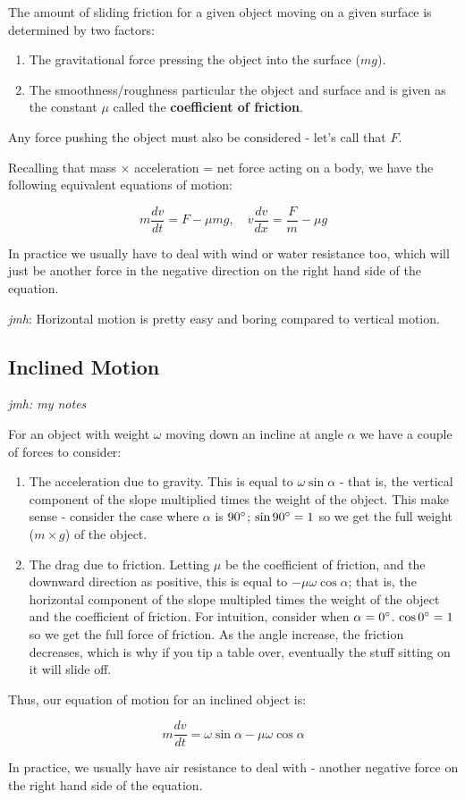\documentclass{article}
\begin{document}
The amount of sliding friction for a given object moving on a given surface is determined by two factors:

\begin{enumerate}
\item The gravitational force pressing the object into the surface ($mg$).
\item The smoothness/roughness particular the object and surface and is given as the constant $\mu$ called the \textbf{coefficient of friction}.
\end{enumerate}

Any force pushing the object must also be considered - let's call that $F$.

Recalling that mass $\times$ acceleration = net force acting on a body, we have the following equivalent equations of motion:

\[ m\frac{dv}{dt} = F - \mu mg, \quad v\frac{dv}{dx} = \frac{F}{m} - \mu g \]

In practice we usually have to deal with wind or water resistance too, which will just be another force in the negative direction on the right hand side of the equation.

\emph{jmh}: Horizontal motion is pretty easy and boring compared to vertical motion.

\subsection{Inclined Motion}

\emph{jmh: my notes}

For an object with weight $\omega$ moving down an incline at angle $\alpha$ we have a couple of forces to consider:

\begin{enumerate}
\item The acceleration due to gravity. This is equal to $\omega\sin{\alpha}$ - that is, the vertical component of the slope multiplied times the weight of the object. This make sense - consider the case where $\alpha$ is $90^\circ$; $\sin{90^\circ} = 1$ so we get the full weight ($m\times g$) of the object.
\item The drag due to friction. Letting $\mu$ be the coefficient of friction, and the downward direction as positive, this is equal to $-\mu\omega\cos{\alpha}$; that is, the horizontal component of the slope multipled times the weight of the object and the coefficient of friction. For intuition, consider when $\alpha = 0^\circ$. $\cos{0^\circ} = 1$ so we get the full force of friction. As the angle increase, the friction decreases, which is why if you tip a table over, eventually the stuff sitting on it will slide off.
\end{enumerate}

Thus, our equation of motion for an inclined object is:

\[ m\frac{dv}{dt} = \omega\sin{\alpha} - \mu\omega\cos{\alpha} \]

In practice, we usually have air resistance to deal with - another negative force on the right hand side of the equation.
\end{document}
